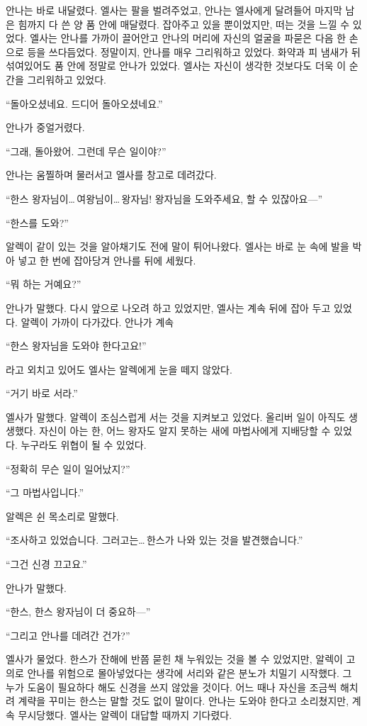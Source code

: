 안나는 바로 내달렸다. 엘사는 팔을 벌려주었고, 안나는 엘사에게 달려들어 마지막 남은 힘까지 다 쓴 양 품 안에 매달렸다. 잡아주고 있을 뿐이었지만, 떠는 것을 느낄 수 있었다. 엘사는 안나를 가까이 끌어안고 안나의 머리에 자신의 얼굴을 파묻은 다음 한 손으로 등을 쓰다듬었다. 정말이지, 안나를 매우 그리워하고 있었다. 화약과 피 냄새가 뒤섞여있어도 품 안에 정말로 안나가 있었다. 엘사는 자신이 생각한 것보다도 더욱 이 순간을 그리워하고 있었다.

``돌아오셨네요. 드디어 돌아오셨네요.''

안나가 중얼거렸다.

``그래, 돌아왔어. 그런데 무슨 일이야?''

안나는 움찔하며 물러서고 엘사를 창고로 데려갔다.

``한스 왕자님이\ldots\,여왕님이\ldots\,왕자님! 왕자님을 도와주세요, 할 수 있잖아요—''

``한스를 도와?''

알렉이 같이 있는 것을 알아채기도 전에 말이 튀어나왔다. 엘사는 바로 눈 속에 발을 박아 넣고 한 번에 잡아당겨 안나를 뒤에 세웠다.

``뭐 하는 거예요?''

안나가 말했다. 다시 앞으로 나오려 하고 있었지만, 엘사는 계속 뒤에 잡아 두고 있었다. 알렉이 가까이 다가갔다. 안나가 계속

``한스 왕자님을 도와야 한다고요!''

라고 외치고 있어도 엘사는 알렉에게 눈을 떼지 않았다.

``거기 바로 서라.''

엘사가 말했다. 알렉이 조심스럽게 서는 것을 지켜보고 있었다. 올리버 일이 아직도 생생했다. 자신이 아는 한, 어느 왕자도 알지 못하는 새에 마법사에게 지배당할 수 있었다. 누구라도 위협이 될 수 있었다.

``정확히 무슨 일이 일어났지?''

``그 마법사입니다.''

알렉은 쉰 목소리로 말했다.

``조사하고 있었습니다. 그러고는\ldots\,한스가 나와 있는 것을 발견했습니다.''

``그건 신경 끄고요.''

안나가 말했다.

``한스, 한스 왕자님이 더 중요하—''

``그리고 안나를 데려간 건가?''

엘사가 물었다. 한스가 잔해에 반쯤 묻힌 채 누워있는 것을 볼 수 있었지만, 알렉이 고의로 안나를 위험으로 몰아넣었다는 생각에 서리와 같은 분노가 치밀기 시작했다. 그 누가 도움이 필요하다 해도 신경을 쓰지 않았을 것이다. 어느 때나 자신을 조금씩 해치려 계략을 꾸미는 한스는 말할 것도 없이 말이다. 안나는 도와야 한다고 소리쳤지만, 계속 무시당했다. 엘사는 알렉이 대답할 때까지 기다렸다.

